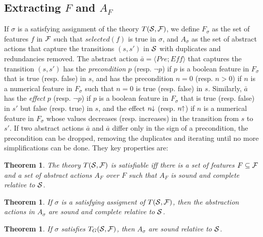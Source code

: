 \documentclass[letterpaper]{article} %
\newcommand{\tup}[1]{\langle #1 \rangle}
\newtheorem{theorem}[definition]{Theorem}
\newcommand{\Eff}{{\mathit{Eff}}}
\newcommand{\abst}[2]{\tup{#1;#2}}
\newcommand{\pplus}{\hspace{-.05em}\raisebox{.15ex}{\footnotesize$\uparrow$}}
\newcommand{\mminus}{\hspace{-.05em}\raisebox{.15ex}{\footnotesize$\downarrow$}}
\begin{document}
\subsection{Extracting $F$ and  $A_F$}


If  $\sigma$ is  a satisfying assignment of the theory $T({\cal S},{\cal F})$, 
we define $F_{\sigma}$ as the set of  features $f$ in $\cal F$ such that $selected(f)$ is true in $\sigma$,
and $A_{\sigma}$ as the set of abstract actions that capture  the  transitions $(s,s')$ in ${\cal S}$
with duplicates and redundancies removed. The abstract action $\bar{a}=\abst{Pre}{\Eff}$
that captures the transition $(s,s')$ has the \emph{precondition} $p$ (resp. $\neg p$)
if $p$ is a boolean feature in $F_{\sigma}$ that is true (resp. false) in $s$, and has
the precondition $n=0$ (resp. $n > 0$) if $n$ is a numerical feature in $F_{\sigma}$
such that $n=0$ is true (resp. false) in $s$. Similarly, $\bar{a}$ has the \emph{effect}
$p$ (resp. $\neg p$) if $p$ is a boolean feature in $F_{\sigma}$ that is true (resp. false)
in $s'$ but false (resp. true) in $s$, and the effect $n\mminus$ (resp. $n\pplus$) if $n$ is a numerical feature in $F_{\sigma}$
whose values decreases (resp. increases) in the transition from $s$ to $s'$. 
If two abstract actions $\bar{a}$ and $\bar{a}$ differ only in the sign of a precondition,
the precondition can be dropped, removing the duplicates and iterating until  no more simplifications
can be done. They key properties are:


\begin{theorem}
  The theory $T({\cal S},{\cal F})$ is satisfiable iff there is a set of features $F \subseteq {\cal F}$
  and a set of abstract actions $A_F$ over $F$ such that $A_F$ is sound and complete relative to  ${\cal S}$.
\end{theorem}

\begin{theorem}
  If $\sigma$ is a satisfying assigment of $T({\cal S},{\cal F})$, then the abstraction actions in $A_{\sigma}$ 
  are  sound and complete  relative to  ${\cal S}$.
\end{theorem}

\begin{theorem}
  If $\sigma$ satisfies  $T_G({\cal S},{\cal F})$, then $A_{\sigma}$   are  sound  relative to  ${\cal S}$.
\end{theorem}
\end{document}
